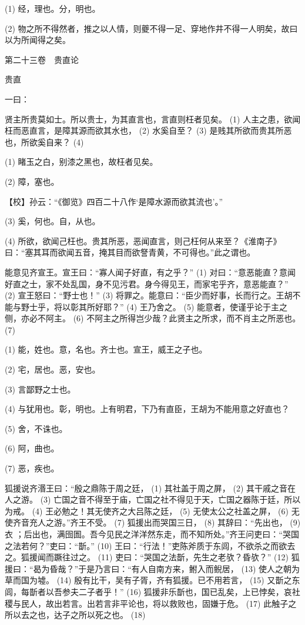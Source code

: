 \documentclass[12pt,UTF8]{ctexbook}
\begin{document}
(1) 经，理也。分，明也。

(2) 物之所不得然者，推之以人情，则夔不得一足、穿地作井不得一人明矣，故曰以为所闻得之矣。





第二十三卷　贵直论



贵直


一曰：

贤主所贵莫如士。所以贵士，为其直言也，言直则枉者见矣。 (1) 人主之患，欲闻枉而恶直言，是障其源而欲其水也， (2) 水奚自至？ (3) 是贱其所欲而贵其所恶也，所欲奚自来？ (4)

(1) 睹玉之白，别漆之黑也，故枉者见矣。

(2) 障，塞也。

【校】孙云：“《御览》四百二十八作‘是障水源而欲其流也’。”

(3) 奚，何也。自，从也。

(4) 所欲，欲闻己枉也。贵其所恶，恶闻直言，则己枉何从来至？《淮南子》曰：“塞其耳而欲闻五音，掩其目而欲詧青黄，不可得也。”此之谓也。

能意见齐宣王。宣王曰：“寡人闻子好直，有之乎？” (1) 对曰：“意恶能直？意闻好直之士，家不处乱国，身不见污君。身今得见王，而家宅乎齐，意恶能直？” (2) 宣王怒曰：“野士也！” (3) 将罪之。能意曰：“臣少而好事，长而行之。王胡不能与野士乎，将以彰其所好耶？” (4) 王乃舍之。 (5) 能意者，使谨乎论于主之侧，亦必不阿主。 (6) 不阿主之所得岂少哉？此贤主之所求，而不肖主之所恶也。 (7)

(1) 能，姓也。意，名也。齐士也。宣王，威王之子也。

(2) 宅，居也。恶，安也。

(3) 言鄙野之士也。

(4) 与犹用也。彰，明也。上有明君，下乃有直臣，王胡为不能用意之好直也？

(5) 舍，不诛也。

(6) 阿，曲也。

(7) 恶，疾也。

狐援说齐湣王曰：“殷之鼎陈于周之廷， (1) 其社盖于周之屏， (2) 其干戚之音在人之游。 (3) 亡国之音不得至于庙，亡国之社不得见于天，亡国之器陈于廷，所以为戒。 (4) 王必勉之！其无使齐之大吕陈之廷， (5) 无使太公之社盖之屏， (6) 无使齐音充人之游。”齐王不受。 (7) 狐援出而哭国三日， (8) 其辞曰：“先出也， (9) 衣 ；后出也，满囹圄。吾今见民之洋洋然东走，而不知所处。”齐王问吏曰：“哭国之法若何？”吏曰：“斮。” (10) 王曰：“行法！”吏陈斧质于东闾，不欲杀之而欲去之。狐援闻而蹶往过之。 (11) 吏曰：“哭国之法斮，先生之老欤？昏欤？” (12) 狐援曰：“曷为昏哉？”于是乃言曰：“有人自南方来，鲋入而鲵居， (13) 使人之朝为草而国为墟。 (14) 殷有比干，吴有子胥，齐有狐援。已不用若言， (15) 又斮之东闾，每斮者以吾参夫二子者乎！” (16) 狐援非乐斮也，国已乱矣，上已悖矣，哀社稷与民人，故出若言。出若言非平论也，将以救败也，固嫌于危。 (17) 此触子之所以去之也，达子之所以死之也。 (18)
\end{document}
